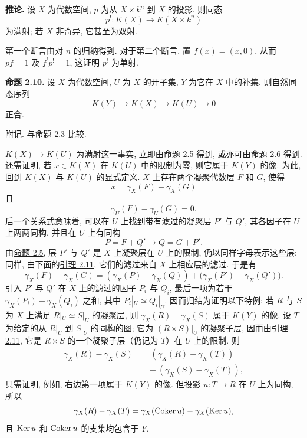 \textbf{推论.} 设 $X$ 为代数空间, $p$ 为从 $X\times k^n$ 到 $X$ 的投影. 则同态
\[
 p^!:K(X)\longrightarrow K(X\times k^n)
\]
为满射; 若 $X$ 非奇异, 它甚至为双射.

第一个断言由对 $n$ 的归纳得到. 对于第二个断言, 置 $f(x)=(x,0)$, 从而 $pf=1$ 及 $f^!p^!=1$, 这证明 $p^!$ 为单射.

\textbf{命题 2.10.} 设 $X$ 为代数空间, $U$ 为 $X$ 的开子集, $Y$ 为它在 $X$ 中的补集. 则自然同态序列
\begin{equation}\tag{2.30}
 K(Y)\longrightarrow K(X)\longrightarrow K(U)\longrightarrow 0
\end{equation}
正合.

附记. 与\hyperlink{sga6.e00.prop.2-3}{命题 2.3} 比较.

$K(X)\to K(U)$ 为满射这一事实, 立即由\hyperlink{sga6.e00.prop.2-5}{命题 2.5} 得到, 或亦可由\hyperlink{sga6.e00.prop.2-6}{命题 2.6} 得到. 还需证明, 若 $x\in K(X)$ 在 $K(U)$ 中的限制为零, 则它属于 $K(Y)$ 的像. 为此, 回到 $K(X)$ 与 $K(U)$ 的显式定义. $X$ 上存在两个凝聚代数层 $F$ 和 $G$, 使得
\[
 x=\gamma_X(F)-\gamma_X(G)
\]
且
\[
 \gamma_U(F)-\gamma_U(G)=0.
\]
后一个关系式意味着, 可以在 $U$ 上找到带有滤过的凝聚层 $P'$ 与 $Q'$, 其各因子在 $U$ 上两两同构, 并且在 $U$ 上有同构
\[
 P=F+Q'\longrightarrow Q=G+P'.
\]
由\hyperlink{sga6.e00.prop.2-5}{命题 2.5}, 层 $P'$ 与 $Q'$ 是 $X$ 上凝聚层在 $U$ 上的限制, 仍以同样字母表示这些层; 同样, 由下面的\hyperlink{sga6.e00.lem.2-11}{引理 2.11}, 它们的滤过来自 $X$ 上相应层的滤过. 于是有
\[
 \gamma_X(F)-\gamma_X(G)=(\gamma_X(P)-\gamma_X(Q))+\bigl(\gamma_X(P')-\gamma_X(Q')\bigr).
\]
引入 $P'$ 与 $Q'$ 在 $X$ 上的滤过的因子 $P_i$ 与 $Q_i$, 最后一项为若干 $\gamma_X(P_i)-\gamma_X(Q_i)$ 之和, 其中 $P_i|_U\simeq Q_i|_U$. 因而归结为证明以下特例: 若 $R$ 与 $S$ 为 $X$ 上满足 $R|_U\simeq S|_U$ 的凝聚层, 则 $\gamma_X(R)-\gamma_X(S)$ 属于 $K(Y)$ 的像. 设 $T$ 为给定的从 $R|_U$ 到 $S|_U$ 的同构的图; 它为 $(R\times S)|_U$ 的凝聚子层, 因而由\hyperlink{sga6.e00.lem.2-11}{引理 2.11}, 它是 $R\times S$ 的一个凝聚子层（仍记为 $T$）在 $U$ 上的限制. 则
\[
 \begin{aligned}
 \gamma_X(R)-\gamma_X(S)&=(\gamma_X(R)-\gamma_X(T))\\
 &\quad-(\gamma_X(S)-\gamma_X(T)),
 \end{aligned}
\]
只需证明, 例如, 右边第一项属于 $K(Y)$ 的像. 但投影 $u:T\to R$ 在 $U$ 上为同构, 所以
\[
 \gamma_X(R)-\gamma_X(T)=\gamma_X(\operatorname{Coker} u)-\gamma_X(\operatorname{Ker} u),
\]
且 $\operatorname{Ker} u$ 和 $\operatorname{Coker} u$ 的支集均包含于 $Y$.

